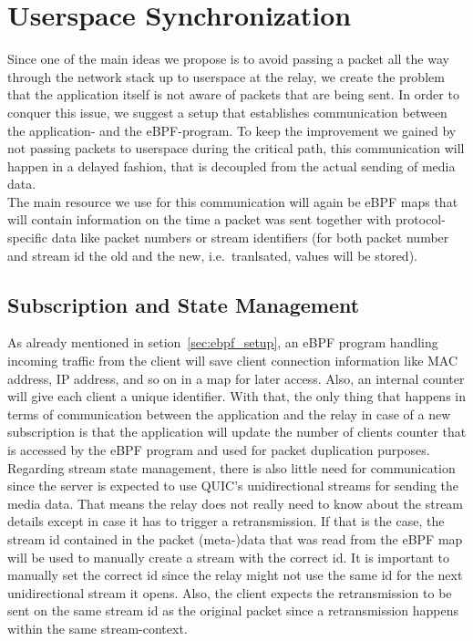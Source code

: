 \section{Userspace Synchronization}\label{sec:userspace_synchronization}

Since one of the main ideas we propose is to avoid passing a packet all the way
through the network stack up to userspace at the relay, we create the problem
that the application itself is not aware of packets that are being sent.
In order to conquer this issue, we suggest a setup that establishes communication
between the application- and the eBPF-program.
To keep the improvement we gained by not passing packets to userspace during the 
critical path, this communication will happen in a delayed fashion, that is 
decoupled from the actual sending of media data.
\\
The main resource we use for this communication will again be eBPF maps that
will contain information on the time a packet was sent together with protocol-specific 
data like packet numbers or stream identifiers (for both packet number 
and stream id the old and the new, i.e.~tranlsated, values will be stored).



\subsection{Subscription and State Management}
As already mentioned in setion~\ref{sec:ebpf_setup}, an eBPF program handling incoming
traffic from the client will save client connection information like MAC address, IP 
address, and so on in a map for later access.
Also, an internal counter will give each client a unique identifier. %
With that, the only thing that happens in terms of communication between the application 
and the relay in case of a new subscription is that the application will update the number 
of clients counter that is accessed by the eBPF program and used for packet duplication purposes.
\\
Regarding stream state management, there is also little need for communication since the 
server is expected to use QUIC's unidirectional streams for sending the media data. 
That means the relay does not really need to know about the stream details except in case it 
has to trigger a retransmission.
If that is the case, the stream id contained in the packet (meta-)data that was read from the eBPF map 
will be used to manually create a stream with the correct id.
It is important to manually set the correct id since the relay might not use the same id for the 
next unidirectional stream it opens.
Also, the client expects the retransmission to be sent on the same stream id as the original packet
since a retransmission happens within the same stream-context.

